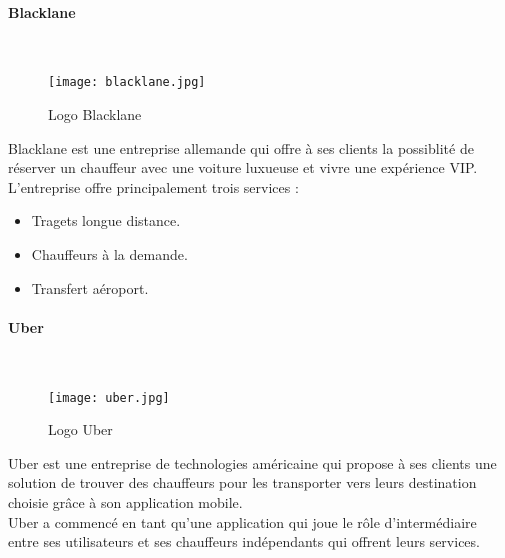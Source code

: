\paragraph{Blacklane}\mbox{} \\
\vspace{1cm}
\begin{figure}[H]
    \centering
    \texttt{[image: blacklane.jpg]}
    \vspace{0.5cm}
    \caption{Logo Blacklane}
    \label{fig:blacklane_logo}
\end{figure}
\vspace{1cm}
Blacklane est une entreprise allemande qui offre à ses clients la possiblité de réserver un chauffeur avec une voiture luxueuse et vivre une expérience VIP.\\
\noindent L'entreprise offre principalement trois services :
\begin{itemize}
    \item Tragets longue distance.
    \item Chauffeurs à la demande.
    \item Transfert aéroport.
\end{itemize}
\paragraph{Uber}\mbox{} \\
\vspace{1cm}
\begin{figure}[H]
    \centering
    \texttt{[image: uber.jpg]}
    \vspace{0.5cm}
    \caption{Logo Uber}
    \label{fig:uber_logo}
\end{figure}
\vspace{1cm}
Uber est une entreprise de technologies américaine qui propose à ses clients une solution de trouver des chauffeurs pour les transporter vers leurs destination choisie grâce à son application mobile.\\
\noindent Uber a commencé en tant qu'une application qui joue le rôle d'intermédiaire entre ses utilisateurs et ses chauffeurs indépendants qui offrent leurs services.
